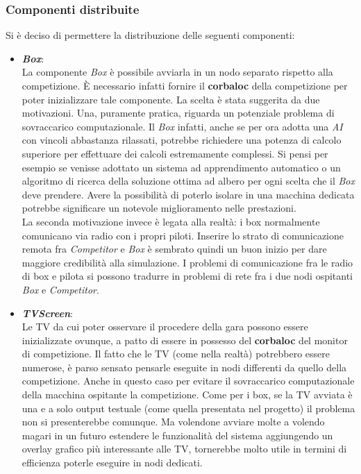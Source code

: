 \subsubsection{Componenti distribuite}%
Si \`{e} deciso di permettere la distribuzione delle seguenti componenti:
\begin{itemize}
\item\textbf{\emph{Box}}:\\
La componente \emph{Box} \`{e} possibile avviarla in un nodo separato rispetto alla competizione. \`{E} necessario infatti fornire il \textbf{corbaloc} della competizione
per poter inizializzare tale componente. La scelta \`{e} stata suggerita da due motivazioni. Una, puramente pratica, riguarda un potenziale problema di sovraccarico 
computazionale. Il \emph{Box} infatti, anche se per ora adotta una \emph{AI} con vincoli abbastanza rilassati, potrebbe richiedere una potenza di calcolo superiore
per effettuare dei calcoli estremamente complessi. Si pensi per esempio se venisse adottato un sistema ad apprendimento automatico o un algoritmo di ricerca della
soluzione ottima ad albero per ogni scelta che il \emph{Box} deve prendere. Avere la possibilit\`{a} di poterlo isolare in una macchina dedicata potrebbe significare
un notevole miglioramento nelle prestazioni.\\
La seconda motivazione invece \`{e} legata alla realt\`{a}: i box normalmente comunicano via radio con i propri piloti. Inserire lo strato di comunicazione remota
fra \emph{Competitor} e \emph{Box} \`{e} sembrato quindi un buon inizio per dare maggiore credibilit\`{a} alla simulazione. I problemi di comunicazione fra le radio
di box e pilota si possono tradurre in problemi di rete fra i due nodi ospitanti \emph{Box} e \emph{Competitor}.
\item\textbf{\emph{TVScreen}}:\\
Le TV da cui poter osservare il procedere della gara possono essere inizializzate ovunque, a patto di essere in possesso del \textbf{corbaloc} del monitor di competizione.
Il fatto che le TV (come nella realt\`{a}) potrebbero essere numerose, \`{e} parso sensato pensarle eseguite in nodi differenti da quello della competizione. Anche in questo
caso per evitare il sovraccarico computazionale della macchina ospitante la competizione. Come per i box, se la TV avviata \`{e} una e a solo output testuale (come quella
presentata nel progetto) il problema non si presenterebbe comunque. Ma volendone avviare molte a volendo magari in un futuro estendere le funzionalit\`{a} del sistema
aggiungendo un overlay grafico pi\`{u} interessante alle TV, tornerebbe molto utile in termini di efficienza poterle eseguire in nodi dedicati.
\end{itemize}
